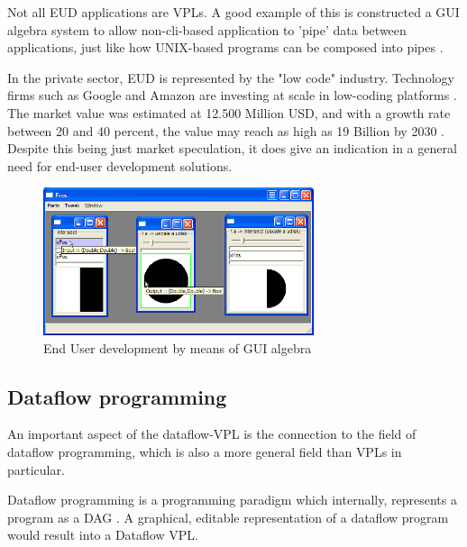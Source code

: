 Not all \ac{EUD} applications are \ac{VPL}s. A good example of this is \citet{elliott_tangible_2007} constructed a \ac{GUI} algebra system to allow non-cli-based application to 'pipe' data between applications, just like how UNIX-based programs can be composed into pipes .

In the private sector, \ac{EUD} is represented by the "low code" industry. 
Technology firms such as Google and Amazon are investing at scale in low-coding platforms \citep{kuhail_characterizing_2021}.
The market value was estimated at 12.500 Million USD, and with a growth rate between 20 and 40 percent, the value may reach as high as 19 Billion by 2030 \citep*{ltd_low-code_2021}.
Despite this being just market speculation, it does give an indication in a general need for end-user development solutions.

\begin{figure}[!tbp]
  \centering
  \begin{minipage}[b]{0.80\textwidth}
    \graphicspath{ {../../assets/images/2/} }
    \includegraphics[width=300px]{gui-algebra.png}
    \caption{End User development by means of GUI algebra \citep{elliott_tangible_2007}}
    \label{fig:gui-algebra}
  \end{minipage}
\end{figure}

\subsection{Dataflow programming}
\label{sec:background:dataflow}
An important aspect of the dataflow-VPL is the connection to the field of dataflow programming, which is also a more general field than \ac{VPL}s in particular. 

Dataflow programming is a programming paradigm which internally, represents a program as a \ac{DAG} \citep{sousa_dataflow_2012}. 
A graphical, editable representation of a dataflow program would result into a Dataflow \ac{VPL}.

